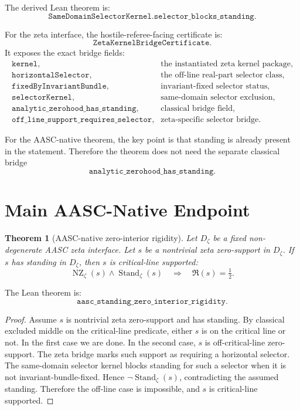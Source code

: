 \documentclass[11pt]{article}
\newtheorem{theorem}{Theorem}
\newcommand{\Half}{\tfrac12}
\newcommand{\zetaD}{D_{\zeta}}
\newcommand{\Stand}{\operatorname{Stand}}
\newcommand{\NZ}{\operatorname{NZ}}
\begin{document}
The derived Lean theorem is:
\[
\texttt{SameDomainSelectorKernel.selector\_blocks\_standing}.
\]

For the zeta interface, the hostile-referee-facing certificate is:
\[
\texttt{ZetaKernelBridgeCertificate}.
\]
It exposes the exact bridge fields:
\[
\begin{array}{ll}
\texttt{kernel}, & \text{the instantiated zeta kernel package},\\
\texttt{horizontalSelector}, & \text{the off-line real-part selector class},\\
\texttt{fixedByInvariantBundle}, & \text{invariant-fixed selector status},\\
\texttt{selectorKernel}, & \text{same-domain selector exclusion},\\
\texttt{analytic\_zerohood\_has\_standing}, & \text{classical bridge field},\\
\texttt{off\_line\_support\_requires\_selector}, & \text{zeta-specific selector bridge}.
\end{array}
\]

For the AASC-native theorem, the key point is that standing is already present
in the statement.  Therefore the theorem does not need the separate classical
bridge
\[
  \texttt{analytic\_zerohood\_has\_standing}.
\]

\section{Main AASC-Native Endpoint}

\begin{theorem}[AASC-native zero-interior rigidity]
Let \(\zetaD\) be a fixed non-degenerate AASC zeta interface.  Let \(s\) be a
nontrivial zeta zero-support in \(\zetaD\).  If \(s\) has standing in
\(\zetaD\), then \(s\) is critical-line supported:
\[
  \NZ_{\zeta}(s) \wedge \Stand_{\zeta}(s)
  \quad\Longrightarrow\quad
  \Re(s)=\Half.
\]
\end{theorem}

The Lean theorem is:
\[
\texttt{aasc\_standing\_zero\_interior\_rigidity}.
\]

\begin{proof}
Assume \(s\) is nontrivial zeta zero-support and has standing.  By classical
excluded middle on the critical-line predicate, either \(s\) is on the
critical line or not.  In the first case we are done.  In the second case,
\(s\) is off-critical-line zero-support.  The zeta bridge marks such support
as requiring a horizontal selector.  The same-domain selector kernel blocks
standing for such a selector when it is not invariant-bundle-fixed.  Hence
\(\neg\Stand_{\zeta}(s)\), contradicting the assumed standing.  Therefore the
off-line case is impossible, and \(s\) is critical-line supported.
\end{proof}
\end{document}
